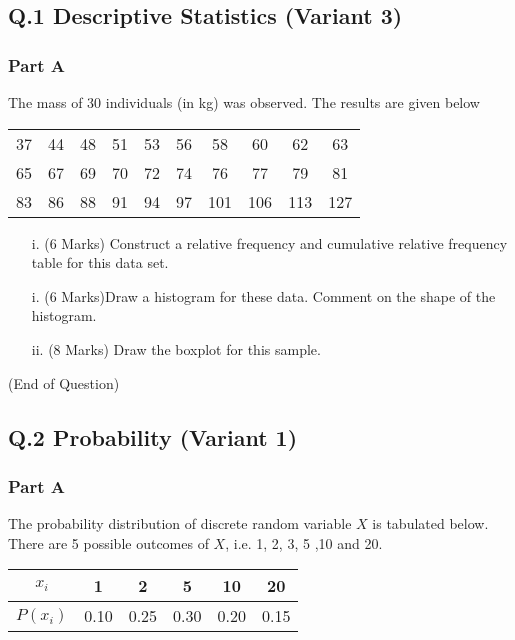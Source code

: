 \documentclass[a4paper,12pt]{article}
\begin{document}
\subsection*{Q.1 Descriptive Statistics (Variant 3)}
\subsubsection*{Part A} %
The mass of 30 individuals (in kg) was observed. The results are given below
\begin{center}

\begin{tabular}{|c c c c c c c c c c|}
  \hline
37&44&48&51&53&56&58&60&62&63\\
65&67&69&70&72&74&76&77&79&81\\
83&86&88&91&94&97&101&106&113&127\\
  \hline
\end{tabular}

\end{center}
\begin{itemize}
\item[i.](6 Marks) Construct a relative frequency and cumulative relative frequency table for this data set.
\item[i.](6 Marks)Draw a histogram for these data. Comment on the shape of the histogram.
\item[ii.](8 Marks) Draw the boxplot for this sample.
\end{itemize}
(End of Question)
\newpage
\subsection*{Q.2 Probability (Variant 1)}

\subsubsection*{Part A}
 The probability distribution of discrete random variable $X$ is tabulated below. There are 5 possible outcomes of $X$, i.e. 1, 2, 3, 5 ,10 and 20.
\begin{center}
\begin{tabular}{|c||c|c|c|c|c|}
\hline
$x_i$  & 1 & 2 & 5 & 10 & 20 \\\hline
$P(x_i)$ &  0.10 & 0.25 & 0.30& 0.20 &0.15\\

\hline
\end{tabular}
\end{center}
\end{document}
